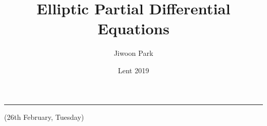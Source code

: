 \documentclass[12pt,a4paper]{article}
\DeclarePairedDelimiter\bignorm{\lVert}{\rVert}
\newcommand{\doublerule}[1][.4pt]{%
  \noindent
  \makebox[0pt][l]{\rule[.7ex]{\linewidth}{#1}}%
  \rule[.3ex]{\linewidth}{#1}}
\begin{document}
\title{Elliptic Partial Differential Equations}
\author{Jiwoon Park}
\date{Lent 2019}

\maketitle

\newcommand{\latinmodern}[1]{{\fontfamily{lmss}\selectfont
\textbf{#1}
}}

\newcommand{\thm}{\latinmodern{Theorem) }}
\newcommand{\thmnum}[1]{\latinmodern{Theorem #1) }}
\newcommand{\defi}{\latinmodern{Definition) }}
\newcommand{\definum}[1]{\latinmodern{Definition #1) }}
\newcommand{\lem}{\latinmodern{Lemma) }}
\newcommand{\lemnum}[1]{\latinmodern{Lemma #1) }}
\newcommand{\prop}{\latinmodern{Proposition) }}
\newcommand{\propnum}[1]{\latinmodern{Proposition #1) }}
\newcommand{\corr}{\latinmodern{Corollary) }}
\newcommand{\corrnum}[1]{\latinmodern{Corollary #1) }}
\newcommand{\pf}{\textbf{proof) }}

\newcommand{\lap}{\triangle} %
\newcommand{\s}{\vspace{10pt}}
\newcommand{\bull}{$\bullet$}
\newcommand{\sta}{$\star$}
\newcommand{\reals}{\mathbb{R}}

\newcommand{\norms}[2]{\bignorm[\big]{#1}_{#2}}
\newcommand{\snorms}[2]{\bignorm[\small]{#1}_{#2}}

\newcommand{\eop}{\hfill  \textsl{(End of proof)} $\square$} %
\newcommand{\eos}{\hfill  \textsl{(End of statement)} $\square$} %

\newcommand{\intN}{\mathbb{Z}_N}
\newcommand{\nat}{\mathbb{N}}

\newcommand{\abs}[1]{\big| #1 \big|}
\newcommand{\avg}{\mathbb{E}}
\newcommand{\prob}{\mathbb{P}}
\newcommand{\borel}{\mathscr{B}}
\newcommand{\EE}{\mathscr{E}}
\newcommand{\pa}{\partial}

\newcommand{\call}[1]{\quad \cdots\cdots\cdots\,\,(#1)}

\renewcommand{\vec}{\underline}
\renewcommand{\bar}{\overline}

\def\doubleunderline#1{\underline{\underline{#1}}}

\newcommand{\newday}{\doublerule[0.5pt]}
\newcommand{\digression}{**********************************************************************************************}

\setlength\parindent{0pt}
\s

\newday

(26th February, Tuesday)
\s
\end{document}
